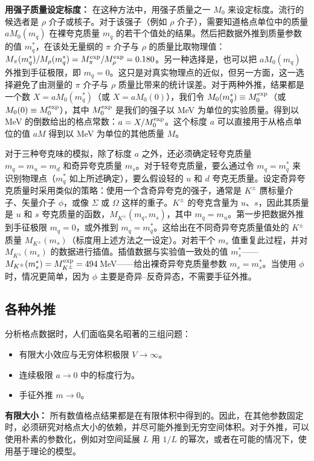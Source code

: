 \textbf{用强子质量设定标度：} 在这种方法中，用强子质量之一 $M_0$ 来设定标度。流行的候选者是 $\rho$ 介子或核子。对于该强子（例如 $\rho$ 介子），需要知道格点单位中的质量 $aM_0(m_q)$ 在裸夸克质量 $m_q$ 的若干个值处的结果。然后把数据外推到质量参数的值 $m_q^*$，在该处无量纲的 $\pi$ 介子与 $\rho$ 的质量比取物理值：$M_\pi(m_q^*)/M_\rho(m_q^*) = M_\pi^{\rm exp}/M_\rho^{\rm exp} = 0.180$。另一种选择是，也可以把 $aM_0(m_q)$ 外推到手征极限，即 $m_q = 0$。这只是对真实物理点的近似，但另一方面，这一选择避免了由测量的 $\pi$ 介子与 $\rho$ 质量比带来的统计误差。对于两种外推，结果都是一个数 $X = aM_0(m_q^*)$（或 $X = aM_0(0)$），我们令 $M_0(m_q^*) \equiv M_0^{\rm exp}$（或 $M_0(0) \equiv M_0^{\rm exp}$），其中 $M_0^{\rm exp}$ 是我们的强子以 MeV 为单位的实验质量。得到以 MeV 的倒数给出的格点常数：$a = X/M_0^{\rm exp}$。这个标度 $a$ 可以直接用于从格点单位的值 $aM$ 得到以 MeV 为单位的其他质量 $M$。

对于三种夸克味的模拟，除了标度 $a$ 之外，还必须确定轻夸克质量 $m_q = m_u = m_d$ 和奇异夸克质量 $m_s$。对于轻夸克质量，要么通过令 $m_q = m_q^*$ 来识别物理点（$m_q^*$ 如上所述确定），要么假设轻的 $u$ 和 $d$ 夸克无质量。设定奇异夸克质量时采用类似的策略：使用一个含奇异夸克的强子，通常是 $K^\pm$ 赝标量介子、矢量介子 $\phi$，或像 $\Sigma$ 或 $\Omega$ 这样的重子。$K^\pm$ 的夸克含量为 $u$、$s$，因此其质量是 $u$ 和 $s$ 夸克质量的函数，$M_{K^\pm}(m_q, m_s)$，其中 $m_q = m_u$。第一步把数据外推到手征极限 $m_q = 0$，或外推到 $m_q = m_q^*$。这给出在不同奇异夸克质量值处的 $K^\pm$ 质量 $M_{K^\pm}(m_s)$（标度用上述方法之一设定）。对若干个 $m_s$ 值重复此过程，并对 $M_{K^\pm}(m_s)$ 的数据进行插值。插值数据与实验值一致处的值 $m_s^*$——$M_{K^\pm}(m_s^*) = M_{K^\pm}^{\rm exp} = 494$\,MeV——给出裸奇异夸克质量参数 $m_s = m_s^*$。当使用 $\phi$ 时，情况更简单，因为 $\phi$ 主要是奇异–反奇异态，不需要手征外推。

\subsection{各种外推}

分析格点数据时，人们面临臭名昭著的三组问题：
\begin{itemize}
  \item 有限大小效应与无穷体积极限 $V \to \infty$。
  \item 连续极限 $a \to 0$ 中的标度行为。
  \item 手征外推 $m \to 0$。
\end{itemize}

\textbf{有限大小：} 所有数值格点结果都是在有限体积中得到的。因此，在其他参数固定时，必须研究对格点大小的依赖，并尽可能外推到无穷空间体积。对于外推，可以使用朴素的参数化，例如对空间延展 $L$ 用 $1/L$ 的幂次，或者在可能的情况下，使用基于理论的模型。

